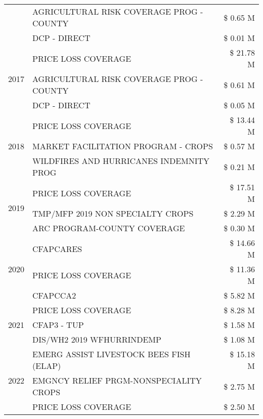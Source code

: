 \begin{tabular}{llr}
 & AGRICULTURAL RISK COVERAGE PROG - COUNTY & \$ 0.65 M \\
 & DCP - DIRECT & \$ 0.01 M \\
\cline{1-3}
\multirow[t]{3}{*}{2017} & PRICE LOSS COVERAGE & \$ 21.78 M \\
 & AGRICULTURAL RISK COVERAGE PROG - COUNTY & \$ 0.61 M \\
 & DCP - DIRECT & \$ 0.05 M \\
\cline{1-3}
\multirow[t]{3}{*}{2018} & PRICE LOSS COVERAGE & \$ 13.44 M \\
 & MARKET FACILITATION PROGRAM - CROPS & \$ 0.57 M \\
 & WILDFIRES AND HURRICANES INDEMNITY PROG & \$ 0.21 M \\
\cline{1-3}
\multirow[t]{3}{*}{2019} & PRICE LOSS COVERAGE & \$ 17.51 M \\
 & TMP/MFP 2019 NON SPECIALTY CROPS & \$ 2.29 M \\
 & ARC PROGRAM-COUNTY COVERAGE & \$ 0.30 M \\
\cline{1-3}
\multirow[t]{3}{*}{2020} & CFAPCARES & \$ 14.66 M \\
 & PRICE LOSS COVERAGE & \$ 11.36 M \\
 & CFAPCCA2 & \$ 5.82 M \\
\cline{1-3}
\multirow[t]{3}{*}{2021} & PRICE LOSS COVERAGE & \$ 8.28 M \\
 & CFAP3 - TUP & \$ 1.58 M \\
 & DIS/WH2 2019 WFHURRINDEMP & \$ 1.08 M \\
\cline{1-3}
\multirow[t]{3}{*}{2022} & EMERG ASSIST LIVESTOCK BEES FISH (ELAP) & \$ 15.18 M \\
 & EMGNCY RELIEF PRGM-NONSPECIALITY CROPS & \$ 2.75 M \\
 & PRICE LOSS COVERAGE & \$ 2.50 M \\
\cline{1-3}
\bottomrule
\end{tabular}
